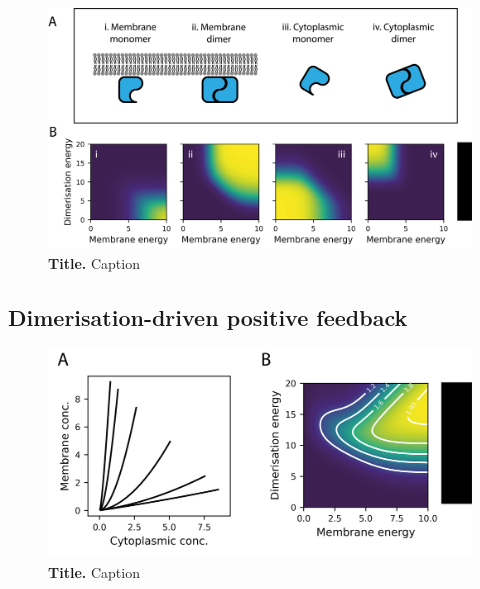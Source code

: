 \documentclass[12pt]{"article"}
\newcommand{\mycaption}[2]{\caption[#1]{\textbf{#1.} #2}}
\begin{document}
\begin{figure}[!h]
\includegraphics[scale=0.9]{thermodynamic_model_species}
\setlength{\abovecaptionskip}{20pt}
\centering
\mycaption{Title}{Caption}
\end{figure}



\subsection{Dimerisation-driven positive feedback}




\begin{figure}[!h]
\includegraphics[scale=0.9]{thermodynamic_model_feedback}
\setlength{\abovecaptionskip}{20pt}
\centering
\mycaption{Title}{Caption}
\end{figure}
\end{document}
